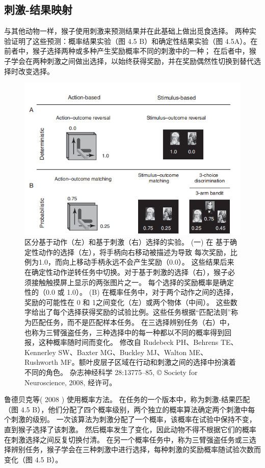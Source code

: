 \subsection{刺激-结果映射}
与其他动物一样，猴子使用刺激来预测结果并在此基础上做出觅食选择。 两种实验证明了这些预测：概率结果实验（图 4.5 B）和确定性结果实验（图 4.5A）。在前者中，猴子选择两种或多种产生奖励概率不同的刺激中的一种； 在后者中，猴子学会在两种刺激之间做出选择，以始终获得奖励，并在奖励偶然性切换到替代选择时改变选择。\par
\begin{figure}[!htb]
	\centering
	\includegraphics{image_pfc/Fig_4_5}
	\caption{区分基于动作（左）和基于刺激（右）选择的实验。 (一) 在
		基于确定性动作的选择（左），将手柄向右移动被描述为导致
		每次奖励，比例为1.0，而向上移动手柄永远不会产生奖励（0.0）。 这些结果后来在确定性动作逆转任务中切换。对于基于刺激的选择（右），猴子必须接触触摸屏上显示的两张图片之一。 每个选择的奖励概率是确定性的（0.0 或 1.0）。 (B) 在概率任务中，对于两个动作之间的选择，奖励的可能性在 0 和 1之间变化（左）或两个物体（中间）。 这些数字给出了每个选择获得奖励的试验比例。这些任务根据“匹配法则”称为匹配任务，而不是匹配样本任务。 在三选择辨别任务（右）中，也称为三臂强盗任务，三种选择中的每一种都以不同的概率得到回报，这种概率随时间而变化。 修改自	Rudebeck PH、Behrens TE、Kennerley SW、Baxter MG、Buckley MJ、Walton ME、Rushworth MF。额叶皮层子区域在行动和刺激之间的选择中扮演着不同的角色。 杂志神经科学 28:13775–85, © Society for Neuroscience, 2008, 经许可。}
\end{figure}
鲁德贝克等( 2008 ) 使用概率方法。 在任务的一个版本中，称为刺激-结果匹配（图 4.5 B），他们分配了四个概率级别，两个独立的概率算法确定两个刺激中每个刺激的级别。 一次该算法为刺激分配了一个概率，该概率在试验中保持不变，直到猴子选择了该刺激。 然后概率发生了变化，因此动物不得不根据它们的概率在刺激选择之间反复切换付清。 在另一个概率任务中，称为三臂强盗任务或三选择辨别任务，猴子学会在三种刺激中进行选择，每种刺激的奖励概率随试验次数而变化（图 4.5 B）。\par
